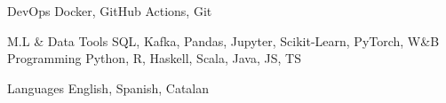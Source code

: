 

\begin{cvskills}

  \cvskill
    {DevOps} %
    {Docker, GitHub Actions, Git} %

  \cvskill
    {M.L \& Data Tools} %
    {SQL, Kafka, Pandas, Jupyter, Scikit-Learn, PyTorch, W\&B} %
  \cvskill
    {Programming} %
    {Python, R, Haskell, Scala, Java, JS, TS} %

  \cvskill
    {Languages} %
    {English, Spanish, Catalan} %

\end{cvskills}
